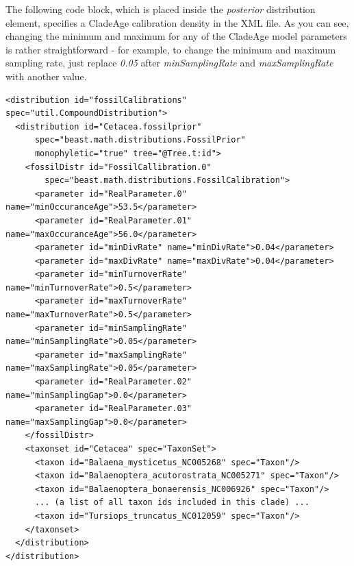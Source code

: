 \documentclass{article}
\begin{document}
\noindent
The following code block, which is placed inside the \emph{posterior} distribution element, specifies a CladeAge calibration density in the XML file. As you can see, changing the minimum and maximum for any of the CladeAge model parameters is rather straightforward - for example, to change the minimum and maximum sampling rate, just replace \emph{0.05} after \emph{minSamplingRate} and \emph{maxSampling\-Rate} with another value.

\footnotesize
\begin{verbatim}
<distribution id="fossilCalibrations" spec="util.CompoundDistribution">
  <distribution id="Cetacea.fossilprior"
      spec="beast.math.distributions.FossilPrior"
      monophyletic="true" tree="@Tree.t:id">
    <fossilDistr id="FossilCallibration.0"
        spec="beast.math.distributions.FossilCalibration">
      <parameter id="RealParameter.0" name="minOccuranceAge">53.5</parameter>
      <parameter id="RealParameter.01" name="maxOccuranceAge">56.0</parameter>
      <parameter id="minDivRate" name="minDivRate">0.04</parameter>
      <parameter id="maxDivRate" name="maxDivRate">0.04</parameter>
      <parameter id="minTurnoverRate" name="minTurnoverRate">0.5</parameter>
      <parameter id="maxTurnoverRate" name="maxTurnoverRate">0.5</parameter>
      <parameter id="minSamplingRate" name="minSamplingRate">0.05</parameter>
      <parameter id="maxSamplingRate" name="maxSamplingRate">0.05</parameter>
      <parameter id="RealParameter.02" name="minSamplingGap">0.0</parameter>
      <parameter id="RealParameter.03" name="maxSamplingGap">0.0</parameter>
    </fossilDistr>
    <taxonset id="Cetacea" spec="TaxonSet">
      <taxon id="Balaena_mysticetus_NC005268" spec="Taxon"/>
      <taxon id="Balaenoptera_acutorostrata_NC005271" spec="Taxon"/>
      <taxon id="Balaenoptera_bonaerensis_NC006926" spec="Taxon"/>
      ... (a list of all taxon ids included in this clade) ...
      <taxon id="Tursiops_truncatus_NC012059" spec="Taxon"/>
    </taxonset>
  </distribution>
</distribution>
\end{verbatim}
\normalsize

\noindent
\end{document}
